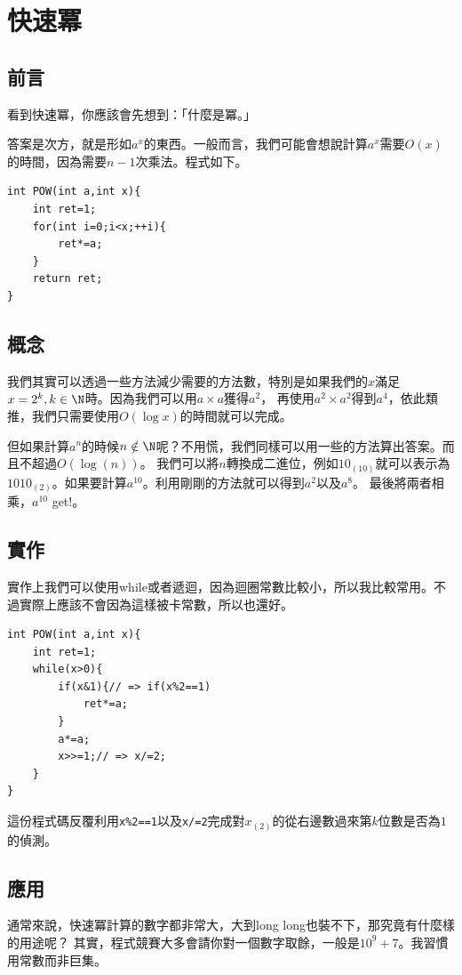 \section{快速冪}
    \subsection{前言}
    看到快速冪，你應該會先想到：「什麼是冪。」

    答案是次方，就是形如$a^x$的東西。一般而言，我們可能會想說計算$a^x$需要$O(x)$的時間，因為需要$n-1$次乘法。程式如下。

\begin{lstlisting}[caption=慢速冪]
int POW(int a,int x){
    int ret=1;
    for(int i=0;i<x;++i){
        ret*=a;
    }
    return ret;
}
\end{lstlisting}

    \subsection{概念}
    我們其實可以透過一些方法減少需要的方法數，特別是如果我們的$x$滿足$x=2^k, k \in \N$時。因為我們可以用$a \times a$獲得$a^2$，
    再使用$a^2 \times a^2$得到$a^4$，依此類推，我們只需要使用$O(\log{x})$的時間就可以完成。

    但如果計算$a^n$的時候$n \notin \N$呢？不用慌，我們同樣可以用一些的方法算出答案。而且不超過$O(\log{(n)})$。
    我們可以將$n$轉換成二進位，例如$10_{(10)}$就可以表示為$1010_{(2)}$。如果要計算$a^{10}$。利用剛剛的方法就可以得到$a^2$以及$a^8$。
    最後將兩者相乘，$a^{10}$ get!。

    \subsection{實作}
    實作上我們可以使用while或者遞迴，因為迴圈常數比較小，所以我比較常用。不過實際上應該不會因為這樣被卡常數，所以也還好。

\begin{lstlisting}[caption=迴圈快速冪]
int POW(int a,int x){
    int ret=1;
    while(x>0){
        if(x&1){// => if(x%2==1)
            ret*=a;
        }
        a*=a;
        x>>=1;// => x/=2;
    }
}
\end{lstlisting}

    這份程式碼反覆利用\verb|x%2==1|以及\verb|x/=2|完成對$x_{(2)}$的從右邊數過來第$k$位數是否為$1$的偵測。

    \subsection{應用}
    通常來說，快速冪計算的數字都非常大，大到long long也裝不下，那究竟有什麼樣的用途呢？
    其實，程式競賽大多會請你對一個數字取餘，一般是$10^{9}+7$。我習慣用常數而非巨集。

